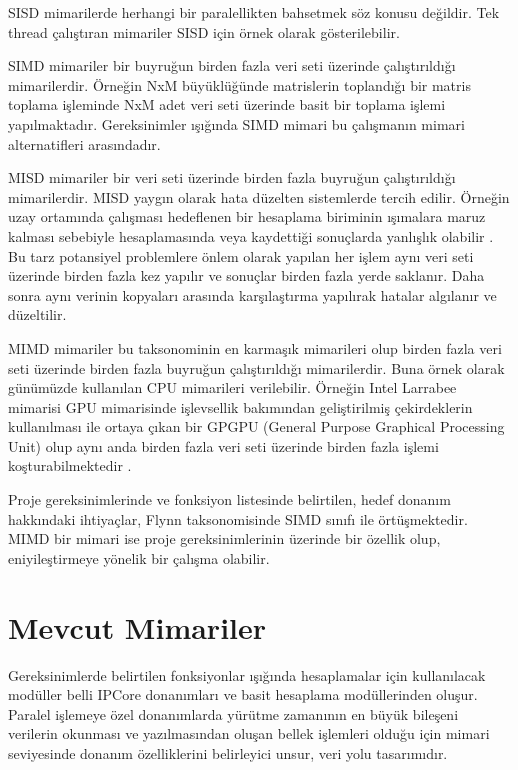 
SISD mimarilerde herhangi bir paralellikten bahsetmek söz konusu değildir. Tek thread çalıştıran mimariler SISD için örnek olarak gösterilebilir. \par

SIMD mimariler bir buyruğun birden fazla veri seti üzerinde çalıştırıldığı mimarilerdir. Örneğin NxM büyüklüğünde matrislerin toplandığı bir matris toplama işleminde NxM adet veri seti üzerinde basit bir toplama işlemi yapılmaktadır. Gereksinimler ışığında SIMD mimari bu çalışmanın mimari alternatifleri arasındadır. \par

MISD mimariler bir veri seti üzerinde birden fazla buyruğun çalıştırıldığı mimarilerdir. MISD yaygın olarak hata düzelten sistemlerde tercih edilir. Örneğin uzay ortamında çalışması hedeflenen bir hesaplama biriminin ışımalara maruz kalması sebebiyle hesaplamasında veya kaydettiği sonuçlarda yanlışlık olabilir \cite{shivakumar2002modeling}. Bu tarz potansiyel problemlere önlem olarak yapılan her işlem aynı veri seti üzerinde birden fazla kez yapılır ve sonuçlar birden fazla yerde saklanır. Daha sonra aynı verinin kopyaları arasında karşılaştırma yapılırak hatalar algılanır ve düzeltilir. \par

MIMD mimariler bu taksonominin en karmaşık mimarileri olup birden fazla veri seti üzerinde birden fazla buyruğun çalıştırıldığı mimarilerdir. Buna örnek olarak günümüzde kullanılan CPU mimarileri verilebilir. Örneğin Intel Larrabee mimarisi GPU mimarisinde işlevsellik bakımından geliştirilmiş çekirdeklerin kullanılması ile ortaya çıkan bir GPGPU (General Purpose Graphical Processing Unit) olup aynı anda birden fazla veri seti üzerinde birden fazla işlemi koşturabilmektedir \cite{seiler2008larrabee}.\par

Proje gereksinimlerinde ve fonksiyon listesinde belirtilen, hedef donanım hakkındaki ihtiyaçlar, Flynn taksonomisinde SIMD sınıfı ile örtüşmektedir. MIMD bir mimari ise proje gereksinimlerinin üzerinde bir özellik olup, eniyileştirmeye yönelik bir çalışma olabilir.

\section{Mevcut Mimariler}
Gereksinimlerde belirtilen fonksiyonlar ışığında hesaplamalar için kullanılacak modüller belli IPCore donanımları ve basit hesaplama modüllerinden oluşur. Paralel işlemeye özel donanımlarda yürütme zamanının en büyük bileşeni verilerin okunması ve yazılmasından oluşan bellek işlemleri olduğu için mimari seviyesinde donanım özelliklerini belirleyici unsur, veri yolu tasarımıdır.\par

